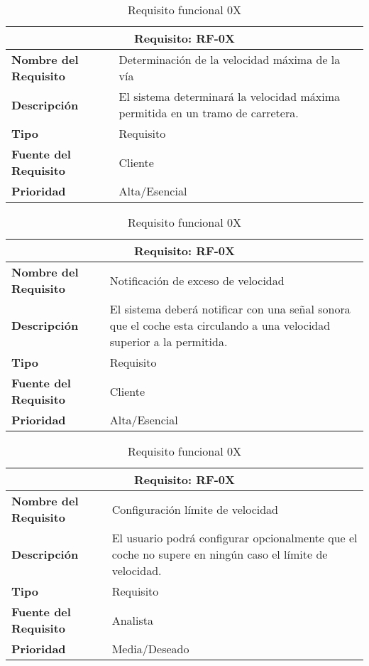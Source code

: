 \documentclass[10pt,a4paper,oldfontcommands]{dpds}
\begin{document}
\begin{table}[H]
\begin{center}
\begin{tabular}{p{} p{7cm}}
\multicolumn{2}{c}{\textbf{Requisito: RF-0X} } \\
\hline \hline
\textbf{Nombre del Requisito} & Determinación de la velocidad máxima de la vía \\
\textbf{Descripción} & El sistema determinará la velocidad máxima permitida en un tramo de carretera. \\
\textbf{Tipo} & Requisito  \\
\textbf{Fuente del Requisito} & Cliente  \\
\textbf{Prioridad} & Alta/Esencial  \\ \hline
\end{tabular}
\caption{Requisito funcional 0X}
\label{tab:personal}
\end{center}
\end{table}

\begin{table}[H]
\begin{center}
\begin{tabular}{p{} p{7cm}}
\multicolumn{2}{c}{\textbf{Requisito: RF-0X} } \\
\hline \hline
\textbf{Nombre del Requisito} & Notificación de exceso de velocidad \\
\textbf{Descripción} & El sistema deberá notificar con una señal sonora que el coche esta circulando a una velocidad superior a la permitida. \\
\textbf{Tipo} & Requisito  \\
\textbf{Fuente del Requisito} & Cliente \\
\textbf{Prioridad} & Alta/Esencial  \\ \hline
\end{tabular}
\caption{Requisito funcional 0X}
\label{tab:personal}
\end{center}
\end{table}

\begin{table}[H]
\begin{center}
\begin{tabular}{p{} p{7cm}}
\multicolumn{2}{c}{\textbf{Requisito: RF-0X} } \\
\hline \hline
\textbf{Nombre del Requisito} & Configuración límite de velocidad \\
\textbf{Descripción} & El usuario podrá configurar opcionalmente que el coche no supere en ningún caso el límite de velocidad. \\
\textbf{Tipo} & Requisito  \\
\textbf{Fuente del Requisito} & Analista  \\
\textbf{Prioridad} & Media/Deseado  \\ \hline
\end{tabular}
\caption{Requisito funcional 0X}
\label{tab:personal}
\end{center}
\end{table}
\end{document}
